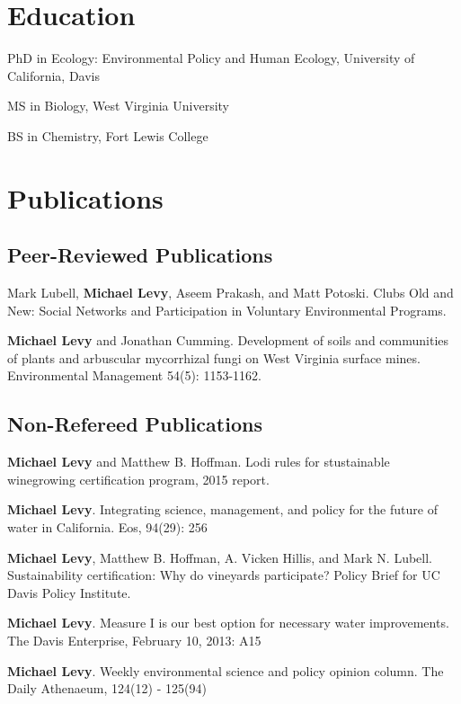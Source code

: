 \section{Education}\label{education}

\begin{description}
\tightlist
\item[2017 (anticipated)]
PhD in Ecology: Environmental Policy and Human Ecology, University of
California, Davis
\item[2012]
MS in Biology, West Virginia University
\item[2004]
BS in Chemistry, Fort Lewis College
\end{description}

\section{Publications}\label{publications}

\subsection{Peer-Reviewed
Publications}\label{peer-reviewed-publications}

\begin{description}
\tightlist
\item[In review]
Mark Lubell, \textbf{Michael Levy}, Aseem Prakash, and Matt Potoski.
Clubs Old and New: Social Networks and Participation in Voluntary
Environmental Programs.
\item[2014]
\textbf{Michael Levy} and Jonathan Cumming. Development of soils and
communities of plants and arbuscular mycorrhizal fungi on West Virginia
surface mines. Environmental Management 54(5): 1153-1162.
\end{description}

\subsection{Non-Refereed Publications}\label{non-refereed-publications}

\begin{description}
\tightlist
\item[2015]
\textbf{Michael Levy} and Matthew B. Hoffman. Lodi rules for
stustainable winegrowing certification program, 2015 report.
\item[2013]
\textbf{Michael Levy}. Integrating science, management, and policy for
the future of water in California. Eos, 94(29): 256
\item[2013]
\textbf{Michael Levy}, Matthew B. Hoffman, A. Vicken Hillis, and Mark N.
Lubell. Sustainability certification: Why do vineyards participate?
Policy Brief for UC Davis Policy Institute.
\item[2013]
\textbf{Michael Levy}. Measure I is our best option for necessary water
improvements. The Davis Enterprise, February 10, 2013: A15
\item[2010 - 2012]
\textbf{Michael Levy}. Weekly environmental science and policy opinion
column. The Daily Athenaeum, 124(12) - 125(94)
\end{description}

